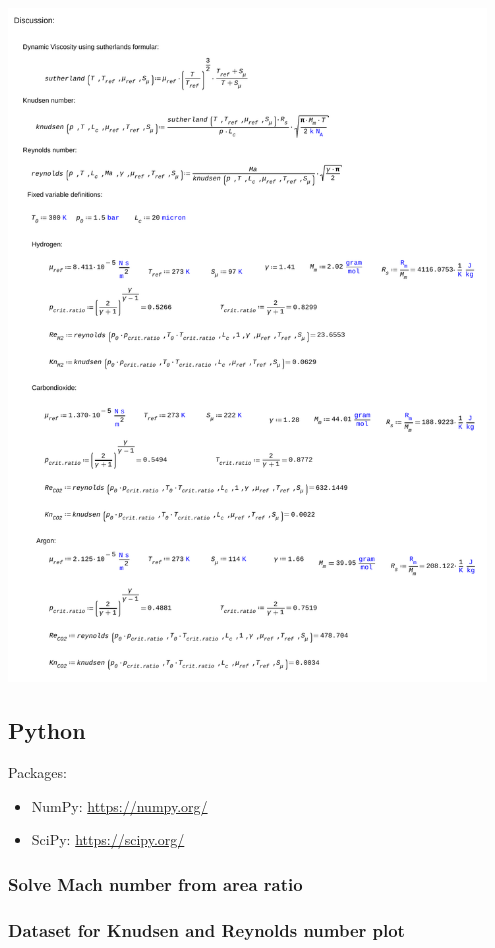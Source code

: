 \newpage
\includegraphics[page=1, width=0.95\textwidth]{code/knudsen_reynolds_discussion.pdf}
\newpage

\subsection{Python}
Packages:
\begin{itemize}
	\item NumPy: \quad \url{https://numpy.org/}
	\item SciPy: \quad \url{https://scipy.org/}
\end{itemize}
\subsubsection{Solve Mach number from area ratio}
\label{apx:mach-py}


\subsubsection{Dataset for Knudsen and Reynolds number plot}
\label{apx:knudsen-plot-py}

